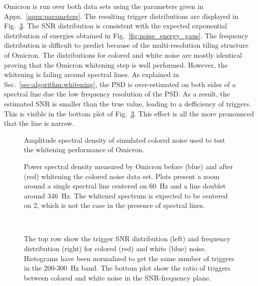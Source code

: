 Omicron is run over both data sets using the parameters given in Appx.~\ref{appx:parameters}. The resulting trigger distributions are displayed in Fig.~\ref{fig:char_cw}. The SNR distribution is consistent with the expected exponential distribution of energies obtained in Fig.~\ref{fig:noise_energy_gaus}. The frequency distribution is difficult to predict because of the multi-resolution tiling structure of Omicron. The distributions for colored and white noise are mostly identical proving that the Omicron whitening step is well performed. However, the whitening is failing around spectral lines. As explained in Sec.~\ref{sec:algorithm:whitening}, the PSD is over-estimated on both sides of a spectral line due the low frequency resolution of the PSD. As a result, the estimated SNR is smaller than the true value, leading to a defficiency of triggers. This is visible in the bottom plot of Fig.~\ref{fig:char_cw}. This effect is all the more pronounced that the line is narrow. 
\begin{figure}
  \center
  \caption{Amplitude spectral density of simulated colored noise used to test the whitening performance of Omicron.}
  \label{fig:noise_asd}
\end{figure}
\begin{figure}
  \center
  \caption{Power spectral density measured by Omicron before (blue) and after (red) whitening the colored noise data set. Plots present a zoom around a single spectral line centered on 60~Hz and a line doublet around 346~Hz. The whitened spectrum is expected to be centered on 2, which is not the case in the presence of spectral lines.}
  \label{fig:char_cw_line}
\end{figure}
\begin{figure}
  \center
   \\
  \caption{The top row show the trigger SNR distribution (left) and frequency distribution (right) for colored (red) and white (blue) noise. Histograms have been normalized to get the same number of triggers in the 200-300~Hz band. The bottom plot show the ratio of triggers between colored and white noise in the SNR-frequency plane.}
  \label{fig:char_cw}
\end{figure}


